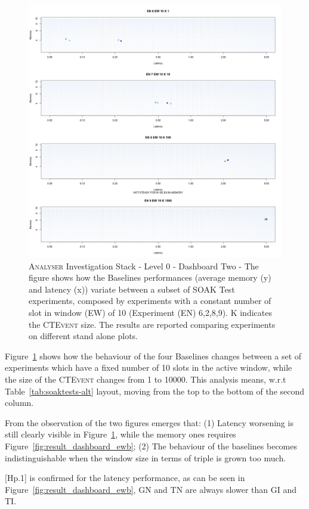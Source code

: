 \begin{figure}[h|tbp]
	\centering
	\includegraphics[width=0.80\linewidth]{images/dashboard-2-split}	
	\caption[\textsc{Analyser} Investigation Stack - Level 0 - Dashboard Two - Split Version]{\textsc{Analyser} Investigation Stack - Level 0 - Dashboard Two - The figure shows how the Baselines performances (average memory (y) and latency (x))  variate between a subset of SOAK Test experiments, composed by experiments with a constant number of slot in window (EW) of 10 (Experiment (EN) 6,2,8,9). K indicates the \textsc{CTEvent} size. The results are reported comparing experiments on different stand alone plots.}
	\label{fig:result_dashboard_ewa}
\end{figure}

Figure~\ref{fig:result_dashboard_ewa} shows how the behaviour of the four Baselines changes between a set of experiments which have a fixed number of 10 slots in the active window, while the size of the \textsc{CTEvent} changes from 1 to 10000. This analysis means, w.r.t Table~\ref{tab:soaktests-alt} layout, moving from the top to the bottom of the second column.

From the observation of the two figures emerges that: (1) Latency worsening is still clearly visible in Figure~\ref{fig:result_dashboard_ewa}, while the memory ones requires Figure~\ref{fig:result_dashboard_ewb}; (2) The behaviour of the baselines becomes indistinguishable when the window size in terms of triple is grown too much. 

[Hp.1] is confirmed for the latency performance, as can be seen in Figure~\ref{fig:result_dashboard_ewb}, GN and TN are always slower than GI and TI. 

